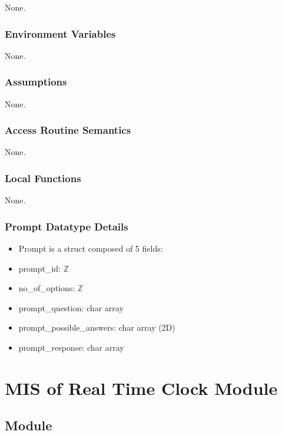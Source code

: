 \documentclass[12pt, titlepage]{article}
\begin{document}
None.

\subsubsection{Environment Variables}

None.

\subsubsection{Assumptions}

None.

\subsubsection{Access Routine Semantics}

None.

\subsubsection{Local Functions}

None.

\subsubsection{Prompt Datatype Details}

\begin{itemize}
\item Prompt is a struct composed of 5 fields:
\item prompt\_id: $\mathbb{Z}$
\item no\_of\_options: $\mathbb{Z}$
\item prompt\_question: char array
\item prompt\_possible\_answers: char array (2D)
\item prompt\_response: char array
\end{itemize}

\newpage




\section{MIS of Real Time Clock Module} \label{mRTC} 

\subsection{Module}
\end{document}
